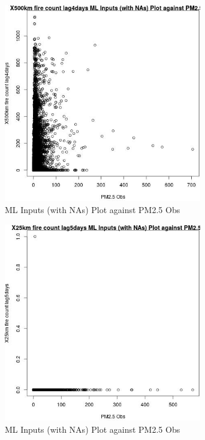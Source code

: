 \begin{figure} 
\centering  
\includegraphics[width=0.77\textwidth]{Code_Outputs/Report_ML_input_PM25_Step4_part_e_de_duplicated_aves_compiled_2019-05-14wNAs_X500km_fire_count_lag4daysvPM25_Obs.jpg} 
\caption{\label{fig:Report_ML_input_PM25_Step4_part_e_de_duplicated_aves_compiled_2019-05-14wNAsX500km_fire_count_lag4daysvPM25_Obs}ML Inputs (with NAs) Plot against PM2.5 Obs} 
\end{figure} 
 

\begin{figure} 
\centering  
\includegraphics[width=0.77\textwidth]{Code_Outputs/Report_ML_input_PM25_Step4_part_e_de_duplicated_aves_compiled_2019-05-14wNAs_X25km_fire_count_lag5daysvPM25_Obs.jpg} 
\caption{\label{fig:Report_ML_input_PM25_Step4_part_e_de_duplicated_aves_compiled_2019-05-14wNAsX25km_fire_count_lag5daysvPM25_Obs}ML Inputs (with NAs) Plot against PM2.5 Obs} 
\end{figure} 
 

